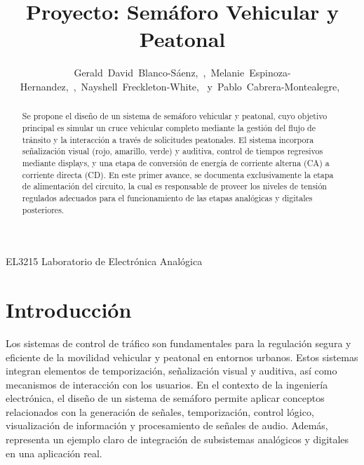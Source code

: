 \documentclass[12pt, journal, onecolumn]{IEEEtran}
\begin{document}
\title{Proyecto: Semáforo Vehicular y Peatonal}
	
	
\author{Gerald~David~Blanco-Sáenz,~,~Melanie~Espinoza-Hernandez,~,~Nayshell~Freckleton-White,~ 
	y~Pablo~Cabrera-Montealegre,~}
	
	
%
{EL3215 Laboratorio de Electrónica Analógica}
	
	
\maketitle
	
\begin{abstract}
		Se propone el diseño de un sistema de semáforo vehicular y peatonal, cuyo objetivo principal es simular un cruce vehicular completo mediante la gestión del flujo de tránsito y la interacción a través de solicitudes peatonales. El sistema incorpora señalización visual (rojo, amarillo, verde) y auditiva, control de tiempos regresivos mediante displays, y una etapa de conversión de energía de corriente alterna (CA) a corriente directa (CD). En este primer avance, se documenta exclusivamente la etapa de alimentación del circuito, la cual es responsable de proveer los niveles de tensión regulados adecuados para el funcionamiento de las etapas analógicas y digitales posteriores.
\end{abstract}
	
\section{Introducción}
	Los sistemas de control de tráfico son fundamentales para la regulación segura y eficiente de la movilidad vehicular y peatonal en entornos urbanos. Estos sistemas integran elementos de temporización, señalización visual y auditiva, así como mecanismos de interacción con los usuarios. En el contexto de la ingeniería electrónica, el diseño de un sistema de semáforo permite aplicar conceptos relacionados con la generación de señales, temporización, control lógico, visualización de información y procesamiento de señales de audio. Además, representa un ejemplo claro de integración de subsistemas analógicos y digitales en una aplicación real. \\
	
\end{document}
